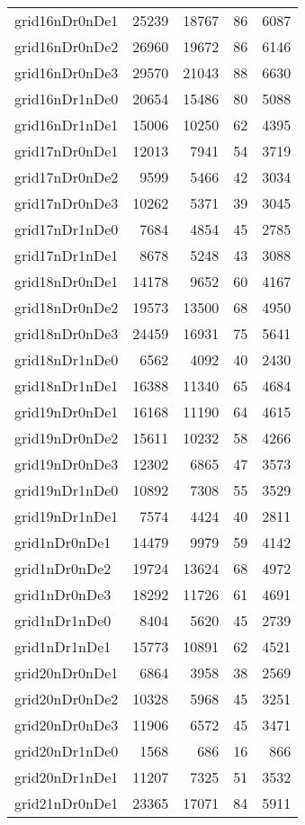 \begin{longtable}{lrrrr}
grid16nDr0nDe1 & 25239 & 18767 & 86 & 6087 \\
grid16nDr0nDe2 & 26960 & 19672 & 86 & 6146 \\
grid16nDr0nDe3 & 29570 & 21043 & 88 & 6630 \\
grid16nDr1nDe0 & 20654 & 15486 & 80 & 5088 \\
grid16nDr1nDe1 & 15006 & 10250 & 62 & 4395 \\
grid17nDr0nDe1 & 12013 & 7941 & 54 & 3719 \\
grid17nDr0nDe2 & 9599 & 5466 & 42 & 3034 \\
grid17nDr0nDe3 & 10262 & 5371 & 39 & 3045 \\
grid17nDr1nDe0 & 7684 & 4854 & 45 & 2785 \\
grid17nDr1nDe1 & 8678 & 5248 & 43 & 3088 \\
grid18nDr0nDe1 & 14178 & 9652 & 60 & 4167 \\
grid18nDr0nDe2 & 19573 & 13500 & 68 & 4950 \\
grid18nDr0nDe3 & 24459 & 16931 & 75 & 5641 \\
grid18nDr1nDe0 & 6562 & 4092 & 40 & 2430 \\
grid18nDr1nDe1 & 16388 & 11340 & 65 & 4684 \\
grid19nDr0nDe1 & 16168 & 11190 & 64 & 4615 \\
grid19nDr0nDe2 & 15611 & 10232 & 58 & 4266 \\
grid19nDr0nDe3 & 12302 & 6865 & 47 & 3573 \\
grid19nDr1nDe0 & 10892 & 7308 & 55 & 3529 \\
grid19nDr1nDe1 & 7574 & 4424 & 40 & 2811 \\
grid1nDr0nDe1 & 14479 & 9979 & 59 & 4142 \\
grid1nDr0nDe2 & 19724 & 13624 & 68 & 4972 \\
grid1nDr0nDe3 & 18292 & 11726 & 61 & 4691 \\
grid1nDr1nDe0 & 8404 & 5620 & 45 & 2739 \\
grid1nDr1nDe1 & 15773 & 10891 & 62 & 4521 \\
grid20nDr0nDe1 & 6864 & 3958 & 38 & 2569 \\
grid20nDr0nDe2 & 10328 & 5968 & 45 & 3251 \\
grid20nDr0nDe3 & 11906 & 6572 & 45 & 3471 \\
grid20nDr1nDe0 & 1568 & 686 & 16 & 866 \\
grid20nDr1nDe1 & 11207 & 7325 & 51 & 3532 \\
grid21nDr0nDe1 & 23365 & 17071 & 84 & 5911 \\

\end{longtable}
